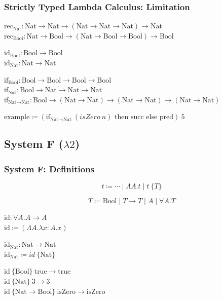 \documentclass{beamer}
\newcommand{\bool}{\text{Bool}}
\newcommand{\nat}{\text{Nat}}
\newcommand{\true}{\text{true}}
\begin{document}
\begin{frame}[fragile]
  \frametitle{Strictly Typed Lambda Calculus: Limitation}

  $\text{rec}_{\nat} : \nat \rightarrow \nat \rightarrow (\nat \rightarrow \nat \rightarrow \nat) \rightarrow \nat$ \\
  $\text{rec}_{\bool} : \nat \rightarrow \bool \rightarrow (\nat \rightarrow \bool \rightarrow \bool) \rightarrow \bool$

  \vspace{5mm}

  $\text{id}_{\bool} : \bool \rightarrow \bool$ \\
  $\text{id}_{\nat} : \nat \rightarrow \nat$

  \vspace{5mm}

  $\text{if}_{\bool} : \bool \rightarrow \bool \rightarrow \bool \rightarrow \bool$ \\
  $\text{if}_{\nat} : \bool \rightarrow \nat \rightarrow \nat \rightarrow \nat$ \\
  $\text{if}_{\nat \rightarrow \nat} : \bool \rightarrow (\nat \rightarrow \nat) \rightarrow (\nat \rightarrow \nat) \rightarrow (\nat \rightarrow \nat)$

  \vspace{5mm}

  $\text{example} \coloneqq (\text{if}_{\nat \rightarrow \nat}\ (isZero\ n)\text{ then succ else pred})\ 5$
\end{frame}

\subsection{System F ($\lambda2$)}

\begin{frame}[fragile]
  \frametitle{System F: Definitions}

  $$
    t \coloneqq \cdots
      \mid \Lambda A . t
      \mid t\ \{T\}
  $$

  $$ T \coloneqq \bool \mid T \rightarrow T \mid A \mid \forall A . T $$

  $\text{id} : \forall A . A \rightarrow A$ \\
  $\text{id} \coloneqq (\Lambda A . \lambda x : A . x)$

  \vspace{5mm}

  $\text{id}_{\nat} : \nat \rightarrow \nat$ \\
  $\text{id}_{\nat} \coloneqq id\ \{\nat\}$

  \vspace{5mm}

  $\text{id}\ \{\bool\}\ \true \rightarrow \true$ \\
  $\text{id}\ \{\nat\}\ 3 \rightarrow 3$ \\
  $\text{id}\ \{\nat \rightarrow \bool\}\ \text{isZero} \rightarrow \text{isZero}$ \\
\end{frame}
\end{document}
